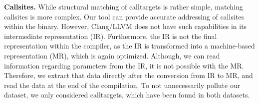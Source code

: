 \textbf{Callsites.} While structural matching of calltargets is rather simple, matching callsites is more complex. Our tool can provide accurate addressing of 
callsites within the binary. However, Clang/LLVM does not have such capabilities in its intermediate representation (IR). Furthermore, the IR is not the final representation within
the compiler, as the IR is transformed into a machine-based representation (MR), which is again optimized. Although, we can read information regarding parameters from the IR, it 
is not possible with the MR. Therefore, we extract that data directly after the conversion from IR to MR, and read the data at the end of the compilation. To not unnecessarily 
pollute our dataset, we only considered calltargets, which have been found in both datasets. 


